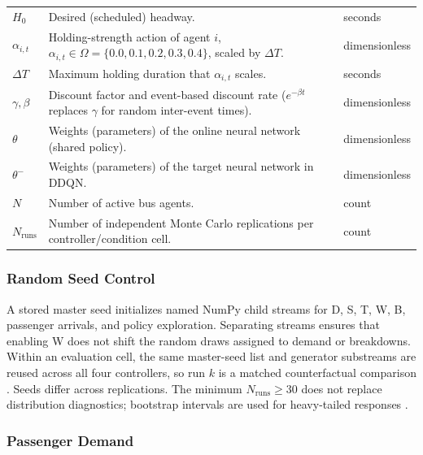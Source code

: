 \begin{table}[!t]
\begin{tabularx}{\textwidth}{
>{\RaggedRight\arraybackslash}p{}
>{\RaggedRight\arraybackslash}X
>{\RaggedRight\arraybackslash}p{}
}
$H_0$ &
Desired (scheduled) headway. &
seconds \\

$\alpha_{i,t}$ &
Holding-strength action of agent $i$, $\alpha_{i,t}\in\Omega=\{0.0,0.1,0.2,0.3,0.4\}$, scaled by $\Delta T$. &
dimensionless \\

$\Delta T$ &
Maximum holding duration that $\alpha_{i,t}$ scales. &
seconds \\

$\gamma,\beta$ &
Discount factor and event-based discount rate ($e^{-\beta t}$ replaces $\gamma$ for random inter-event times). &
dimensionless \\

$\theta$ &
Weights (parameters) of the online neural network (shared policy). &
dimensionless \\

$\theta^-$ &
Weights (parameters) of the target neural network in DDQN. &
dimensionless \\

$N$ &
Number of active bus agents. &
count \\

$N_{\mathrm{runs}}$ &
Number of independent Monte Carlo replications per controller/condition cell. &
count \\

\bottomrule
\end{tabularx}
\end{table}

\subsubsection{Random Seed Control}

A stored master seed initializes named NumPy child streams for D, S, T, W, B, passenger arrivals, and policy exploration. Separating streams ensures that enabling W does not shift the random draws assigned to demand or breakdowns. Within an evaluation cell, the same master-seed list and generator substreams are reused across all four controllers, so run $k$ is a matched counterfactual comparison \cite{Henderson2018Matters}. Seeds differ across replications. The minimum $N_{\mathrm{runs}}\geq30$ does not replace distribution diagnostics; bootstrap intervals are used for heavy-tailed responses \cite{Agarwal2021Precipice}.

\subsubsection{Passenger Demand}

